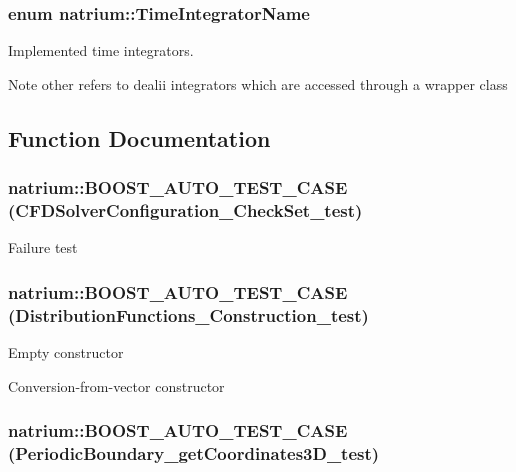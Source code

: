 \hypertarget{namespacenatrium_a00a0ec1e80f138680e0fcca78349f6d8}{
\subsubsection[{TimeIntegratorName}]{\setlength{\rightskip}{0pt plus 5cm}enum {\bf natrium::TimeIntegratorName}}}
\label{namespacenatrium_a00a0ec1e80f138680e0fcca78349f6d8}


Implemented time integrators. \begin{DoxyNote}{Note}
other refers to dealii integrators which are accessed through a wrapper class 
\end{DoxyNote}


\subsection{Function Documentation}
\hypertarget{namespacenatrium_ac5584f4e62acc077516547aba5d60fe0}{
\subsubsection[{BOOST\_\-AUTO\_\-TEST\_\-CASE}]{\setlength{\rightskip}{0pt plus 5cm}natrium::BOOST\_\-AUTO\_\-TEST\_\-CASE (CFDSolverConfiguration\_\-CheckSet\_\-test)}}
\label{namespacenatrium_ac5584f4e62acc077516547aba5d60fe0}


Failure test \hypertarget{namespacenatrium_a3fc48dbb8fbf2d4a981c1d02ef5e555e}{
\subsubsection[{BOOST\_\-AUTO\_\-TEST\_\-CASE}]{\setlength{\rightskip}{0pt plus 5cm}natrium::BOOST\_\-AUTO\_\-TEST\_\-CASE (DistributionFunctions\_\-Construction\_\-test)}}
\label{namespacenatrium_a3fc48dbb8fbf2d4a981c1d02ef5e555e}


Empty constructor

Conversion-\/from-\/vector constructor \hypertarget{namespacenatrium_a6c15033ca6f4995b47ec6f3b8f2c8472}{
\subsubsection[{BOOST\_\-AUTO\_\-TEST\_\-CASE}]{\setlength{\rightskip}{0pt plus 5cm}natrium::BOOST\_\-AUTO\_\-TEST\_\-CASE (PeriodicBoundary\_\-getCoordinates3D\_\-test)}}
\label{namespacenatrium_a6c15033ca6f4995b47ec6f3b8f2c8472}


